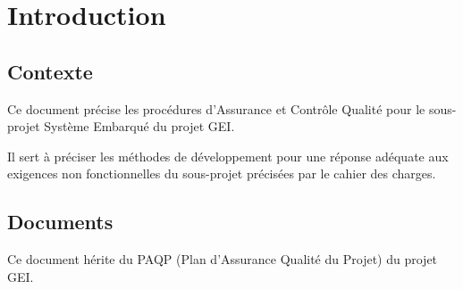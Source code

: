 \section{Introduction}

\subsection{Contexte}

Ce document précise les procédures d'Assurance et Contrôle Qualité pour le 
sous-projet Système Embarqué du projet GEI.

Il sert à préciser les méthodes de développement pour une réponse adéquate
aux exigences non fonctionnelles du sous-projet précisées par le cahier des 
charges.

\subsection{Documents}

Ce document hérite du PAQP (Plan d'Assurance Qualité du Projet) du projet GEI.
